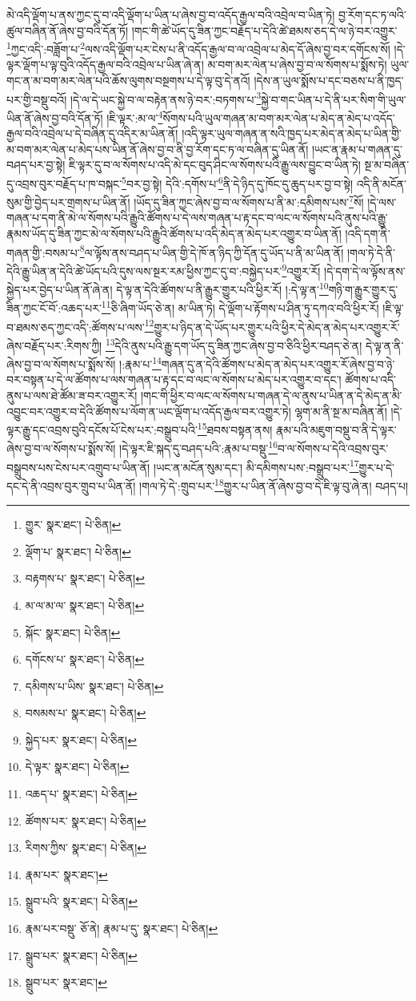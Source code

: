 མེ་འདི་ལྡོག་པ་ནས་ཀྱང་དུ་བ་འདི་ལྡོག་པ་ཡིན་པ་ཞེས་བྱ་བ་འདོད་རྒྱལ་བའི་འབྲེལ་བ་ཡིན་ཏེ། བྱ་རོག་དང་ཏ་ལའི་ཚུལ་བཞིན་ནོ་ཞེས་བྱ་བའི་དོན་ཏོ། །གང་གི་ཚེ་ཡོད་དུ་ཟིན་ཀྱང་བརྗོད་པ་དེའི་ཚེ་ཐམས་ཅད་དེ་ལ་ཉེ་བར་འགྱུར་\footnote{གྱུར་  སྣར་ཐང་།  པེ་ཅིན། }ཀྱང་འདི་:བཟློག་པ་\footnote{ལྡོག་པ་  སྣར་ཐང་།  པེ་ཅིན། }ལས་འདི་ལྡོག་པར་ངེས་པ་ནི་འདོད་རྒྱལ་བ་ལ་འབྲེལ་པ་མེད་དོ་ཞེས་བྱ་བར་དགོངས་སོ། །དེ་ལྟར་ལྡོག་པ་ལྟ་བུའི་འདོད་རྒྱལ་བའི་འབྲེལ་པ་ཡིན་ཞེ་ན། མ་བག་མར་ལེན་པ་ཞེས་བྱ་བ་ལ་སོགས་པ་སྨོས་ཏེ། ཡུལ་གང་ན་མ་བག་མར་ལེན་པའི་ཆོས་ལུགས་བསྔགས་པ་དེ་ལྟ་བུ་དེ་ནའོ། །དེས་ན་ཡུལ་སྨོས་པ་དང་བཅས་པ་ནི་ཁྱད་པར་གྱི་བསྡུ་བའོ། །དེ་ལ་དེ་ཡང་སྐྱེ་བ་ལ་བརྟེན་ནས་ཉེ་བར་:བཏགས་པ་\footnote{བརྟགས་པ་  སྣར་ཐང་།  པེ་ཅིན། }སྐྱེ་བ་གང་ཡིན་པ་དེ་ནི་པར་སིག་གི་ཡུལ་ཡིན་ནོ་ཞེས་བྱ་བའི་དོན་ཏོ། །ཇི་ལྟར་:མ་ལ་\footnote{མ་ལ་མ་ལ་  སྣར་ཐང་།  པེ་ཅིན། }སོགས་པའི་ཡུལ་གཞན་མ་བག་མར་ལེན་པ་མེད་ན་མེད་པ་འདོད་རྒྱལ་བའི་འབྲེལ་པ་དེ་བཞིན་དུ་འདིར་མ་ཡིན་ནོ། །འདི་ལྟར་ཡུལ་གཞན་ན་སའི་ཁྱད་པར་མེད་ན་མེད་པ་ཡིན་གྱི་མ་བག་མར་ལེན་པ་མེད་པས་ཡིན་ནོ་ཞེས་བྱ་བ་ནི་བྱ་རོག་དང་ཏ་ལ་བཞིན་དུ་ཡིན་ནོ། །ཡང་ན་རྣམ་པ་གཞན་དུ་བཤད་པར་བྱ་སྟེ། ཇི་ལྟར་དུ་བ་ལ་སོགས་པ་འདི་མེ་དང་བུད་ཤིང་ལ་སོགས་པའི་རྒྱུ་ལས་བྱུང་བ་ཡིན་ཏེ། སྔ་མ་བཞིན་དུ་འབྲས་བུར་བརྗོད་པ་ཁ་བསྐང་\footnote{སྐོང་  སྣར་ཐང་།  པེ་ཅིན། }བར་བྱ་སྟེ། དེའི་:དགོས་པ་\footnote{དགོངས་པ་  སྣར་ཐང་།  པེ་ཅིན། }ནི་དེ་ཉིད་དུ་ཁོང་དུ་ཆུད་པར་བྱ་བ་སྟེ། འདི་ནི་མངོན་སུམ་གྱི་བྱེད་པར་གྲགས་པ་ཡིན་ནོ། །ཡོད་དུ་ཟིན་ཀྱང་ཞེས་བྱ་བ་ལ་སོགས་པ་ནི་མ་:དམིགས་པས་\footnote{དམིགས་པ་ཡིས་  སྣར་ཐང་།  པེ་ཅིན། }སོ། །དེ་ལས་གཞན་པ་དག་ནི་མེ་ལ་སོགས་པའི་རྒྱུའི་ཚོགས་པ་དེ་ལས་གཞན་པ་རྟ་དང་བ་ལང་ལ་སོགས་པའི་ནུས་པའི་རྒྱུ་རྣམས་ཡོད་དུ་ཟིན་ཀྱང་མེ་ལ་སོགས་པའི་རྒྱུའི་ཚོགས་པ་འདི་མེད་ན་མེད་པར་འགྱུར་བ་ཡིན་ནོ། །འདི་དག་ནི་གཞན་གྱི་:བསམ་པ་\footnote{བསམས་པ་  སྣར་ཐང་།  པེ་ཅིན། }ལ་ལྟོས་ནས་བཤད་པ་ཡིན་གྱི་དེ་ཁོ་ན་ཉིད་ཀྱི་དོན་དུ་ཡོད་པ་ནི་མ་ཡིན་ནོ། །གལ་ཏེ་དེ་ནི་དེའི་རྒྱུ་ཡིན་ན་དེའི་ཚེ་ཡོད་པའི་དུས་ལས་སྔར་རམ་ཕྱིས་ཀྱང་དུ་བ་:བསྐྱེད་པར་\footnote{སྐྱེད་པར་  སྣར་ཐང་།  པེ་ཅིན། }འགྱུར་རོ། །དེ་དག་དེ་ལ་ལྟོས་ནས་སྐྱེད་པར་བྱེད་པ་ཡིན་ནོ་ཞེ་ན། དེ་ལྟ་ན་དེའི་ཚོགས་པ་ནི་རྒྱུར་གྱུར་པའི་ཕྱིར་རོ། །:དེ་ལྟ་ན་\footnote{དེ་ལྟར་  སྣར་ཐང་།  པེ་ཅིན། }གཉི་ག་རྒྱུར་གྱུར་དུ་ཟིན་ཀྱང་ངོ་བོ་:འཆད་པར་\footnote{འཆད་པ་  སྣར་ཐང་།  པེ་ཅིན། }ཅི་ཞིག་ཡོད་ཅེ་ན། མ་ཡིན་ཏེ། དེ་ལྡོག་པ་རྟོགས་པ་ཤིན་ཏུ་དཀའ་བའི་ཕྱིར་རོ། །ཇི་ལྟ་བ་ཐམས་ཅད་ཀྱང་འདི་:ཚོགས་པ་ལས་\footnote{ཚོགས་པར་  སྣར་ཐང་།  པེ་ཅིན། }གྱུར་པ་ཉིད་ན་དེ་ཡོད་པར་གྱུར་པའི་ཕྱིར་དེ་མེད་ན་མེད་པར་འགྱུར་རོ་ཞེས་བརྗོད་པར་:རིགས་ཀྱི། \footnote{རིགས་ཀྱིས་  སྣར་ཐང་།  པེ་ཅིན། }དེའི་ནུས་པའི་རྒྱུ་དག་ཡོད་དུ་ཟིན་ཀྱང་ཞེས་བྱ་བ་ཅིའི་ཕྱིར་བཤད་ཅེ་ན། དེ་ལྟ་ན་ནི་ཞེས་བྱ་བ་ལ་སོགས་པ་སྨོས་སོ། །:རྣམ་པ་\footnote{རྣམ་པར་  སྣར་ཐང་། }གཞན་དུ་ན་དེའི་ཚོགས་པ་མེད་ན་མེད་པར་འགྱུར་རོ་ཞེས་བྱ་བ་ཉེ་བར་བསྟན་པ་དེ་ལ་ཚོགས་པ་ལས་གཞན་པ་རྟ་དང་བ་ལང་ལ་སོགས་པ་མེད་པར་འགྱུར་བ་དང་། ཚོགས་པ་འདི་ནུས་པ་ལས་ཐེ་ཚོམ་ཟ་བར་འགྱུར་རོ། །གང་གི་ཕྱིར་བ་ལང་ལ་སོགས་པ་གཞན་དེ་ལ་ནུས་པ་ཡིན་ན་དེ་མེད་ན་མི་འབྱུང་བར་འགྱུར་བ་དེའི་ཚོགས་པ་ལོག་ན་ཡང་ལྡོག་པ་འདོད་རྒྱལ་བར་འགྱུར་ཏེ། ལྷག་མ་ནི་སྔ་མ་བཞིན་ནོ། །དེ་ལྟར་རྒྱུ་དང་འབྲས་བུའི་དངོས་པོ་ངེས་པར་:བསྒྲུབ་པའི་\footnote{སྒྲུབ་པའི་  སྣར་ཐང་།  པེ་ཅིན། }ཐབས་བསྟན་ནས། རྣམ་པའི་མཇུག་བསྡུ་བ་ནི་དེ་ལྟར་ཞེས་བྱ་བ་ལ་སོགས་པ་སྨོས་སོ། །དེ་ལྟར་ཇི་སྐད་དུ་བཤད་པའི་:རྣམ་པ་བསྡུ་\footnote{རྣམ་པར་བསྡུ་  ཅོ་ནེ། རྣམ་པ་དུ་  སྣར་ཐང་།  པེ་ཅིན། }བ་ལ་སོགས་པ་དེའི་འབྲས་བུར་བསྒྲུབས་པས་ངེས་པར་འགྲུབ་པ་ཡིན་ནོ། །ཡང་ན་མངོན་སུམ་དང་། མི་དམིགས་པས་:བསྒྲུབ་པར་\footnote{སྒྲུབ་པར་  སྣར་ཐང་།  པེ་ཅིན། }གྱུར་པ་དེ་དང་དེ་ནི་འབྲས་བུར་གྲུབ་པ་ཡིན་ནོ། །གལ་ཏེ་དེ་:གྲུབ་པར་\footnote{སྒྲུབ་པར་  སྣར་ཐང་། }གྱུར་པ་ཡིན་ནོ་ཞེས་བྱ་བ་དེ་ཇི་ལྟ་བུ་ཞེ་ན། བཤད་པ། 